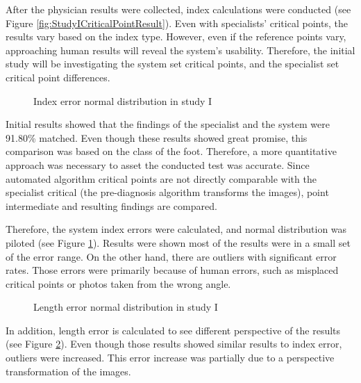 After the physician results were collected, index calculations were conducted (see Figure  \ref{fig:StudyICriticalPointResult}). Even with specialists' critical points, the results vary based on the index type. However, even if the reference points vary, approaching human results will reveal the system's usability. Therefore, the initial study will be investigating the system set critical points, and the specialist set critical point differences.

\begin{figure}[htbp]
\centering
{}
\caption{Index error normal distribution in study I}
\label{fig:StudyIIndexErrorNormalDists}
\end{figure}

Initial results showed that the findings of the specialist and the system were 91.80\% matched. Even though these results showed great promise, this comparison was based on the class of the foot. Therefore, a more quantitative approach was necessary to asset the conducted test was accurate. Since automated algorithm critical points are not directly comparable with the specialist critical (the pre-diagnosis algorithm transforms the images), point intermediate and resulting findings are compared.

Therefore, the system index errors were calculated, and normal distribution was piloted (see Figure \ref{fig:StudyIIndexErrorNormalDists}). Results were shown most of the results were in a small set of the error range. On the other hand, there are outliers with significant error rates. Those errors were primarily because of human errors, such as misplaced critical points or photos taken from the wrong angle. 

\begin{figure}[htbp]
\centering
{}
\caption{Length error normal distribution in study I}
\label{fig:StudyILenghtErrorNormalDists}
\end{figure}

In addition, length error is calculated to see different perspective of the results (see Figure \ref{fig:StudyILenghtErrorNormalDists}). Even though those results showed similar results to index error, outliers were increased. This error increase was partially due to a perspective transformation of the images.